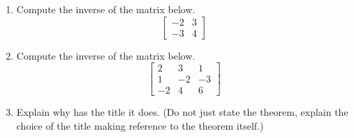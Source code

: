 \begin{enumerate}
%
\item  Compute the inverse of the matrix below.
%
\begin{equation*}
\begin{bmatrix}
-2 & 3\\
-3 & 4
\end{bmatrix}
\end{equation*}
%
%
\item Compute the inverse of the matrix below.
%
\begin{equation*}
\begin{bmatrix}
2 & 3 & 1\\
1 & -2 & -3\\
-2 & 4 & 6
\end{bmatrix}
\end{equation*}
%
\item  Explain why  has the title it does. (Do not just state
the theorem, explain the choice of the title making reference to the
theorem itself.)
%
\end{enumerate}
